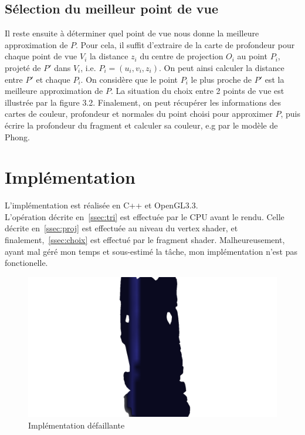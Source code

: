 \subsection{Sélection du meilleur point de vue}
Il reste ensuite à déterminer quel point de vue nous donne la meilleure approximation de $P$. Pour cela, il suffit d'extraire de la carte de profondeur pour chaque point de vue $V_i$ la
distance $z_i$ du centre de projection $O_i$ au point $P_i$, projeté de $P'$ dans $V_i$, i.e. $P_i=(u_i, v_i, z_i)$. On peut ainsi calculer la distance entre $P'$
et chaque $P_i$. On considère que le point $P_i$ le plus proche de $P'$ est la meilleure approximation de $P$. La situation du choix entre 2 points de vue est
illustrée par la figure 3.2. Finalement, on peut récupérer les informations des cartes de couleur, profondeur et normales du point choisi pour approximer $P$,
puis écrire la profondeur du fragment et calculer sa couleur, e.g par le modèle de Phong.

\section{Implémentation}
L'implémentation est réalisée en C++ et OpenGL3.3.\\
L'opération décrite en~\ref{ssec:tri} est effectuée par le CPU avant le rendu. Celle décrite en~\ref{ssec:proj} est effectuée au niveau du vertex shader,
et finalement,~\ref{ssec:choix} est effectué par le fragment shader.
Malheureusement, ayant mal géré mon temps et sous-estimé la t\^ache, mon implémentation n'est pas fonctionelle.

\begin{figure}\label{fig:fail}
    \centering
    \caption{Implémentation défaillante}
    \includegraphics[scale=0.4]{images/fail_transparent.png}
\end{figure}

